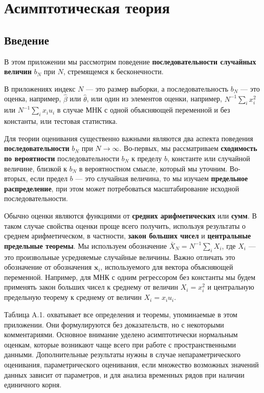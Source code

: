 




\appendix




\chapter{Асимптотическая теория}

\section{Введение}

В этом приложении мы рассмотрим поведение \textbf{последовательности случайных величин} $b_N$ при $N$, стремящемся к бесконечности.

В приложениях индекс $N$ --- это размер выборки, а последовательность $b_N$ --- это оценка, например, $\hat{\beta}$ или $\hat{\theta}$, или один из элементов оценки, например, $N^{-1}\sum_i x_i^2$ или $N^{-1}\sum_i x_i u_i$ в случае МНК с одной объясняющей переменной и без константы, или тестовая статистика.

Для теории оценивания существенно важными являются два аспекта поведения \textbf{последовательности} $b_N$ при $N\to \infty$. Во-первых, мы рассматриваем \textbf{сходимость по вероятности} последовательности $b_N$ к пределу $b$, константе или случайной величине, близкой к $b_N$ в вероятностном смысле, который мы уточним. 
Во-вторых, если предел $b$ --- это случайная величина, то мы изучаем \textbf{предельное распределение}, при этом может потребоваться масштабирование исходной последовательности.

Обычно оценки являются функциями от \textbf{средних арифметических} или \textbf{сумм}. В таком случае свойства оценки проще всего получить, используя результаты о среднем арифметическом, в частности, \textbf{закон больших чисел} и \textbf{центральные предельные теоремы}. Мы используем обозначение $\bar{X}_N=N^{-1}\sum_i X_i$, где $X_i$ --- это произвольные усредняемые случайные величины. Важно отличать это обозначение от обозначения $\mathbf{x}_i$, используемого для вектора объясняющей переменной. Например, для МНК с одним регрессором без константы мы будем применять закон больших чисел к среднему от величин $X_i=x_i^2$ и центральную предельную теорему к среднему от величин $X_i=x_i u_i$.

Таблица A.1. охватывает все определения и теоремы, упоминаемые в этом приложении. Они формулируются без доказательств, но с некоторыми комментариями. Основное внимание уделено асимптотически нормальным оценкам, которые возникают чаще всего при работе с пространственными данными. Дополнительные результаты нужны в случае непараметрического оценивания, параметрического оценивания, если множество возможных значений данных зависит от параметров, и для анализа временных рядов при наличии единичного корня. 

